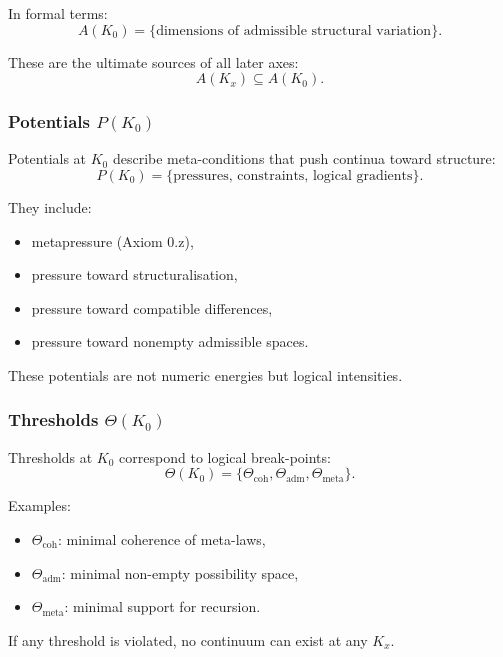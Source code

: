 In formal terms:
\[
A(K_0) = \{ \text{dimensions of admissible structural variation} \}.
\]

These are the ultimate sources of all later axes:
\[
A(K_x) \subseteq A(K_0).
\]

\subsubsection{Potentials \texorpdfstring{$P(K_0)$}{P(K_0)}}

Potentials at $K_0$ describe meta-conditions that push continua toward
structure:
\[
P(K_0) = \{ \text{pressures, constraints, logical gradients} \}.
\]

They include:
\begin{itemize}
    \item metapressure (Axiom 0.z),
    \item pressure toward structuralisation,
    \item pressure toward compatible differences,
    \item pressure toward nonempty admissible spaces.
\end{itemize}

These potentials are not numeric energies but logical intensities.

\subsubsection{Thresholds \texorpdfstring{$\Theta(K_0)$}{\Theta(K_0)}}

Thresholds at $K_0$ correspond to logical break-points:
\[
\Theta(K_0) = \{ \Theta_{\mathrm{coh}}, \Theta_{\mathrm{adm}},
                 \Theta_{\mathrm{meta}} \}.
\]

Examples:
\begin{itemize}
    \item $\Theta_{\mathrm{coh}}$: minimal coherence of meta-laws,
    \item $\Theta_{\mathrm{adm}}$: minimal non-empty possibility space,
    \item $\Theta_{\mathrm{meta}}$: minimal support for recursion.
\end{itemize}

If any threshold is violated, no continuum can exist at any $K_x$.

